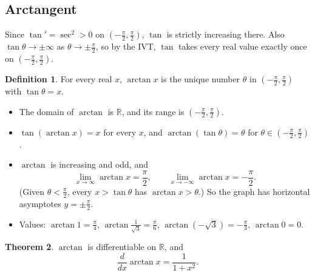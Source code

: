 \documentclass[12pt,letterpaper]{article}
\theoremstyle{definition}
\newtheorem{theorem}{Theorem}[section]
\newtheorem{definition}[theorem]{Definition}
\begin{document}
\subsection{Arctangent}

Since $\tan'=\sec^2>0$ on $(-\frac\pi2,\frac\pi2)$, $\tan$ is strictly
increasing there. Also $\tan\theta\to\pm\infty$ as
$\theta\to\pm\frac\pi2$, so by the IVT, $\tan$ takes every real value exactly
once on $(-\frac\pi2,\frac\pi2)$.

\begin{definition}
  For every real $x$, $\arctan x$ is the unique number $\theta$ in
  $(-\frac\pi2,\frac\pi2)$ with $\tan\theta=x$.
\end{definition}

\begin{itemize}[itemsep=0.2em]
  \item The domain of $\arctan$ is $\mathbb{R}$, and its range is
    $(-\frac\pi2,\frac\pi2)$.
  \item $\tan(\arctan x)=x$ for every $x$, and $\arctan(\tan\theta)=\theta$
    for $\theta\in(-\frac\pi2,\frac\pi2)$.
  \item $\arctan$ is increasing and odd, and
    \[
      \lim_{x\to\infty}\arctan x=\frac\pi2,\qquad
      \lim_{x\to-\infty}\arctan x=-\frac\pi2.
    \]
    (Given $\theta<\frac\pi2$, every $x>\tan\theta$ has $\arctan x>\theta$.)
    So the graph has horizontal asymptotes $y=\pm\frac\pi2$.
  \item Values: $\arctan1=\frac\pi4$, $\arctan\frac{1}{\sqrt3}=\frac\pi6$,
    $\arctan(-\sqrt3)=-\frac\pi3$, $\arctan0=0$.
\end{itemize}

\begin{center}
\end{center}

\begin{theorem}
  $\arctan$ is differentiable on $\mathbb{R}$, and
  \[
    \frac{d}{dx}\arctan x=\frac{1}{1+x^2}.
  \]
\end{theorem}
\end{document}
